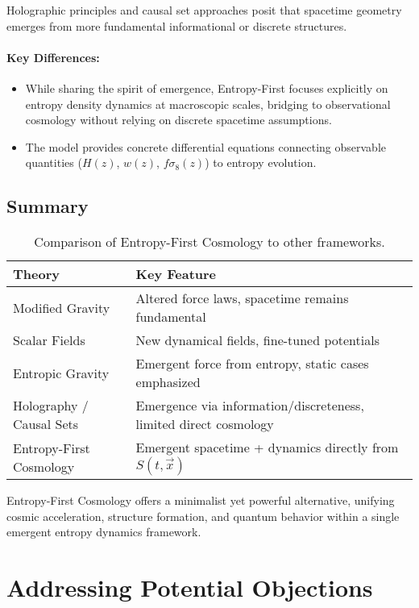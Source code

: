 \documentclass{article}
\begin{document}
Holographic principles and causal set approaches posit that spacetime geometry emerges from more fundamental informational or discrete structures.

\paragraph{Key Differences:}
\begin{itemize}
    \item While sharing the spirit of emergence, Entropy-First focuses explicitly on entropy density dynamics at macroscopic scales, bridging to observational cosmology without relying on discrete spacetime assumptions.
    \item The model provides concrete differential equations connecting observable quantities ($H(z)$, $w(z)$, $f\sigma_8(z)$) to entropy evolution.
\end{itemize}

\subsection{Summary}

\begin{table}[h]
\centering
\begin{tabular}{|l|l|}
\hline
Theory & Key Feature \\
\hline
Modified Gravity & Altered force laws, spacetime remains fundamental \\
Scalar Fields & New dynamical fields, fine-tuned potentials \\
Entropic Gravity & Emergent force from entropy, static cases emphasized \\
Holography / Causal Sets & Emergence via information/discreteness, limited direct cosmology \\
Entropy-First Cosmology & Emergent spacetime + dynamics directly from $S(t, \vec{x})$ \\
\hline
\end{tabular}
\caption{Comparison of Entropy-First Cosmology to other frameworks.}
\end{table}

Entropy-First Cosmology offers a minimalist yet powerful alternative, unifying cosmic acceleration, structure formation, and quantum behavior within a single emergent entropy dynamics framework.

\section{Addressing Potential Objections}
\end{document}
